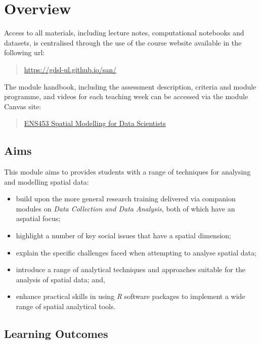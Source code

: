 \documentclass[
  letterpaper,
  DIV=11,
  numbers=noendperiod,
  oneside]{scrreprt}
\providecommand{\tightlist}{%
  \setlength{\itemsep}{0pt}\setlength{\parskip}{0pt}}\usepackage{longtable,booktabs,array}
\begin{document}

\chapter{Overview}\label{overview}

Access to all materials, including lecture notes, computational
notebooks and datasets, is centralised through the use of the course
website available in the following url:

\begin{quote}
\url{https://gdsl-ul.github.io/san/}
\end{quote}

The module handbook, including the assessment description, criteria and
module programme, and videos for each teaching week can be accessed via
the module Canvas site:

\begin{quote}
\href{https://liverpool.instructure.com}{ENS453 Spatial Modelling for
Data Scientists}
\end{quote}

\section{Aims}\label{aims}

This module aims to provides students with a range of techniques for
analysing and modelling spatial data:

\begin{itemize}
\tightlist
\item
  build upon the more general research training delivered via companion
  modules on \emph{Data Collection and Data Analysis}, both of which
  have an aspatial focus;
\item
  highlight a number of key social issues that have a spatial dimension;
\item
  explain the specific challenges faced when attempting to analyse
  spatial data;
\item
  introduce a range of analytical techniques and approaches suitable for
  the analysis of spatial data; and,
\item
  enhance practical skills in using \emph{R} software packages to
  implement a wide range of spatial analytical tools.
\end{itemize}

\section{Learning Outcomes}\label{learning-outcomes}
\end{document}
